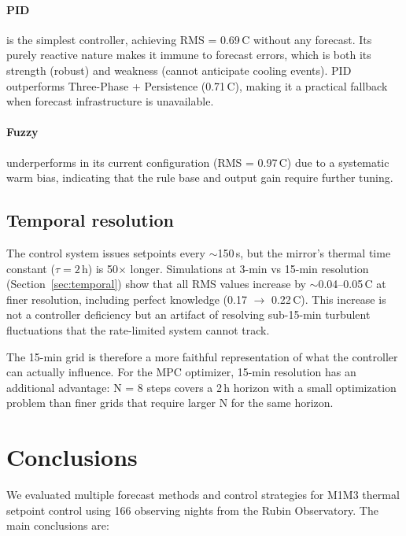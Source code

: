 \documentclass[11pt]{article}
\begin{document}
\paragraph{PID} is the simplest controller,
achieving RMS = 0.69\,\textdegree C without any forecast.  Its purely reactive
nature makes it immune to forecast errors, which is both its strength (robust)
and weakness (cannot anticipate cooling events).  PID outperforms
Three-Phase + Persistence (0.71\,\textdegree C), making it a practical
fallback when forecast infrastructure is unavailable.

\paragraph{Fuzzy} underperforms in its current configuration
(RMS = 0.97\,\textdegree C) due to a systematic warm bias, indicating that the
rule base and output gain require further tuning.

\subsection{Temporal resolution}

The control system issues setpoints every $\sim$150\,s, but the mirror's
thermal time constant ($\tau = 2$\,h) is 50$\times$ longer.  Simulations at
3-min vs 15-min resolution (Section~\ref{sec:temporal}) show that all RMS
values increase by $\sim$0.04--0.05\,\textdegree C at finer resolution,
including perfect knowledge (0.17 $\to$ 0.22\,\textdegree C).  This increase
is not a controller deficiency but an artifact of resolving sub-15-min
turbulent fluctuations that the rate-limited system cannot track.

The 15-min grid is therefore a more faithful representation of what the
controller can actually influence.  For the MPC optimizer, 15-min resolution
has an additional advantage: N = 8 steps covers a 2\,h horizon with a small
optimization problem than finer grids that require larger N for the same
horizon.

\section{Conclusions}
\label{sec:conclusions}

We evaluated multiple forecast methods and control strategies for M1M3 thermal
setpoint control using 166 observing nights from the Rubin Observatory.  The
main conclusions are:
\end{document}
